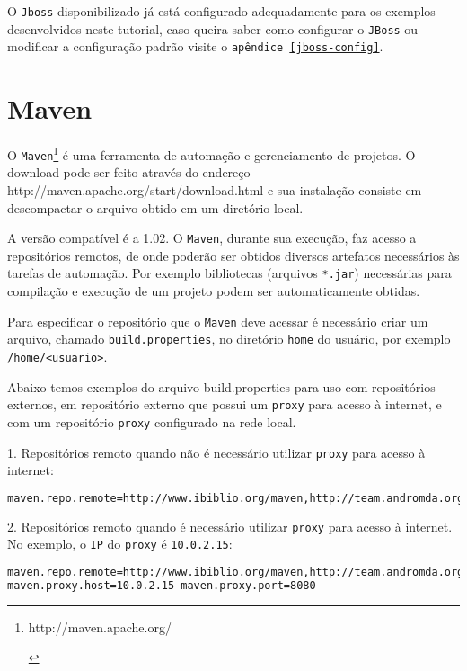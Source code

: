 O \texttt{Jboss} disponibilizado já está configurado adequadamente para os exemplos
desenvolvidos neste tutorial, caso queira saber como configurar o \texttt{JBoss}
ou modificar a configuração padrão visite o \texttt{apêndice \ref{jboss-config}}.

\section{Maven}
O
\texttt{Maven}\footnote{\hypertarget{http://maven.apache.org/}{http://maven.apache.org/}}
é uma ferramenta de automação e gerenciamento de projetos. O download pode ser
feito através do endereço
\hypertarget{http://maven.apache.org/start/download.html}{http://maven.apache.org/start/download.html}
e sua instalação consiste em descompactar o arquivo obtido em um diretório
local.

A versão compatível é a 1.02. O \texttt{Maven}, durante sua execução, faz acesso
a repositórios remotos, de onde poderão ser obtidos diversos artefatos
necessários às tarefas de automação. Por exemplo bibliotecas (arquivos
\texttt{*.jar}) necessárias para compilação e execução de um projeto podem ser
automaticamente obtidas.

Para especificar o repositório que o \texttt{Maven} deve acessar é necessário
criar um arquivo, chamado \texttt{build.properties}, no diretório \texttt{home}
do usuário, por exemplo \texttt{/home/<usuario>}.

Abaixo temos exemplos do arquivo build.properties para uso com repositórios
externos, em repositório externo que possui um \texttt{proxy} para acesso à
internet, e com um repositório \texttt{proxy} configurado na rede local.

1. Repositórios remoto quando não é necessário utilizar \texttt{proxy} para
acesso à internet:

\begin{lstlisting}[language=bash]
maven.repo.remote=http://www.ibiblio.org/maven,http://team.andromda.org/maven 
\end{lstlisting}

2. Repositórios remoto quando é necessário utilizar \texttt{proxy} para acesso à
internet. No exemplo, o \texttt{IP} do \texttt{proxy} é \texttt{10.0.2.15}:

\begin{lstlisting}[language=bash]
maven.repo.remote=http://www.ibiblio.org/maven,http://team.andromda.org/maven
maven.proxy.host=10.0.2.15 maven.proxy.port=8080 
\end{lstlisting}

